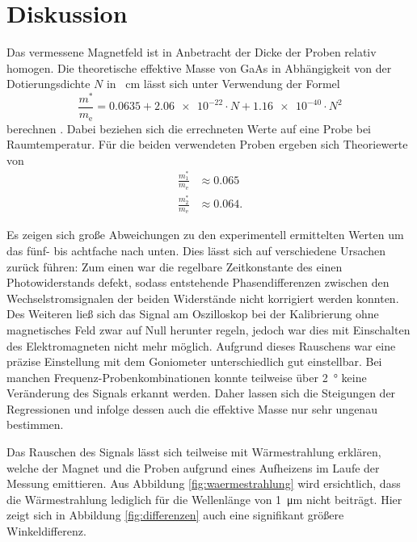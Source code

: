 \newpage
\section{Diskussion}
\label{sec:Diskussion}

Das vermessene Magnetfeld ist in Anbetracht der Dicke der Proben relativ
homogen.
Die theoretische effektive Masse von GaAs in Abhängigkeit von der Dotierungsdichte
$N$ in \si{\centi\meter} lässt sich unter Verwendung der
Formel
\begin{equation}
  \frac{m^*}{m_\text{e}} =
  \num{0.0635} + \num{2.06e-22} \cdot N + \num{1.16e-40} \cdot N^2
  \label{eqn:Theoriewert}
\end{equation}
berechnen \cite[7]{Nakwaski}. Dabei beziehen sich die errechneten Werte auf eine
Probe bei Raumtemperatur.
Für die beiden verwendeten Proben ergeben sich Theoriewerte von
\begin{align*}
  \frac{m^*_1}{m_\text{e}} &\approx \num{0.065} \\
  \frac{m^*_2}{m_\text{e}} &\approx \num{0.064}.
\end{align*}

Es zeigen sich große Abweichungen zu den experimentell ermittelten
Werten um das fünf- bis achtfache nach unten.
Dies lässt sich auf verschiedene Ursachen zurück führen:
Zum einen war die regelbare Zeitkonstante des einen Photowiderstands
defekt, sodass entstehende Phasendifferenzen zwischen den
Wechselstromsignalen der beiden Widerstände nicht korrigiert werden konnten.
Des Weiteren ließ sich das Signal am Oszilloskop bei der Kalibrierung ohne
magnetisches Feld zwar auf Null herunter regeln, jedoch war dies mit
Einschalten des Elektromagneten nicht mehr möglich.
Aufgrund dieses Rauschens war eine präzise Einstellung mit dem Goniometer
unterschiedlich gut einstellbar. Bei manchen Frequenz-Probenkombinationen
konnte teilweise über \SI{2}{\degree} keine Veränderung des Signals
erkannt werden. Daher lassen sich die Steigungen der Regressionen
und infolge dessen auch die effektive Masse nur sehr ungenau bestimmen.

Das Rauschen des Signals lässt sich teilweise mit Wärmestrahlung erklären,
welche der Magnet und die Proben aufgrund eines Aufheizens im Laufe
der Messung emittieren. Aus Abbildung \ref{fig:waermestrahlung}
wird ersichtlich, dass die Wärmestrahlung lediglich für die
Wellenlänge von \SI{1}{\micro\meter} nicht beiträgt.
Hier zeigt sich in Abbildung \ref{fig:differenzen} auch
eine signifikant größere Winkeldifferenz.

